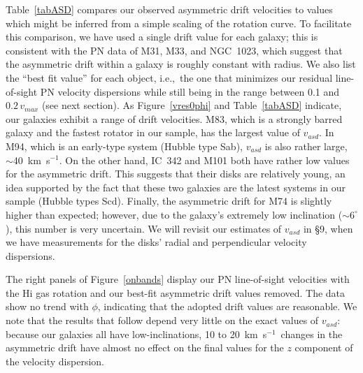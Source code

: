 \documentclass[12pt,preprint]{emulateapj}
\newcommand{\ie}{{i.e.,}}
\newcommand{\kms}{km~s$^{-1}$}
\begin{document}
Table~\ref{tabASD} compares our observed asymmetric drift velocities to values which might be inferred from a simple scaling of the rotation curve. To facilitate this comparison, we have used a single drift value for each galaxy; this is consistent with the PN data of M31, M33, and NGC~1023, which suggest that the asymmetric drift within a galaxy is roughly constant with radius.  We also list the ``best fit value'' for each object, \ie\ the one that minimizes our residual line-of-sight PN velocity dispersions while still being in the range between 0.1 and $0.2 \, v_{max}$ (see next section).   As Figure~\ref{vres0phi} and Table~\ref{tabASD} indicate, our galaxies exhibit a range of drift velocities.  M83, which is a strongly barred galaxy and the fastest rotator in our sample, has the largest value of $v_{asd}$.  In M94, which is an early-type system (Hubble type Sab), $v_{asd}$ is also rather large, $\sim$40~\kms.  On the other hand, IC~342 and M101 both have rather low values for the asymmetric drift.  This suggests that their disks are relatively young, an idea supported by the fact that these two galaxies are the latest systems in our sample (Hubble types Scd).  Finally, the asymmetric drift for M74 is slightly higher than expected; however, due to the galaxy's extremely low inclination ($\sim 6^\circ$), this number is very uncertain.  We will revisit our estimates of $v_{asd}$ in \S 9, when we have measurements for the disks' radial and perpendicular velocity dispersions.

The right panels of Figure~\ref{onbands} display our PN line-of-sight velocities with the H{\sc i} gas rotation and our best-fit asymmetric drift values removed.  The data show no trend with $\phi$, indicating that the adopted drift values are reasonable.  We note that the results that follow depend very little on the exact values of $v_{asd}$: because our galaxies all have low-inclinations, 10 to 20~\kms\  changes in the asymmetric drift have almost no effect on the final values for the $z$ component of the velocity dispersion.
\end{document}
